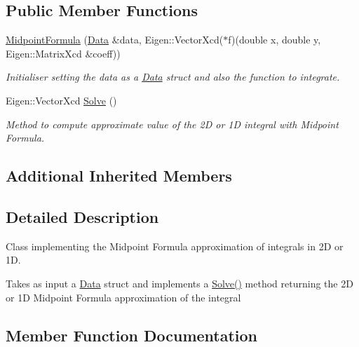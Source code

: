 \subsection*{Public Member Functions}
\begin{DoxyCompactItemize}
\item 
\mbox{\label{class_midpoint_formula_a6217c8547e15ad68ab99f4ab4d8f9f3c}} 
\hyperlink{class_midpoint_formula_a6217c8547e15ad68ab99f4ab4d8f9f3c}{Midpoint\+Formula} (\hyperlink{struct_data}{Data} \&data, Eigen\+::\+Vector\+Xcd($\ast$f)(double x, double y, Eigen\+::\+Matrix\+Xcd \&coeff))
\begin{DoxyCompactList}\small\item\em Initialiser setting the data as a \hyperlink{struct_data}{Data} struct and also the function to integrate. \end{DoxyCompactList}\item 
Eigen\+::\+Vector\+Xcd \hyperlink{class_midpoint_formula_add437323dfb0bc181b0051c5aaf80ba7}{Solve} ()
\begin{DoxyCompactList}\small\item\em Method to compute approximate value of the 2D or 1D integral with Midpoint Formula. \end{DoxyCompactList}\end{DoxyCompactItemize}
\subsection*{Additional Inherited Members}


\subsection{Detailed Description}
Class implementing the Midpoint Formula approximation of integrals in 2D or 1D. 

Takes as input a \hyperlink{struct_data}{Data} struct and implements a \hyperlink{class_midpoint_formula_add437323dfb0bc181b0051c5aaf80ba7}{Solve()} method returning the 2D or 1D Midpoint Formula approximation of the integral 

\subsection{Member Function Documentation}
\mbox{\label{class_midpoint_formula_add437323dfb0bc181b0051c5aaf80ba7}} 
